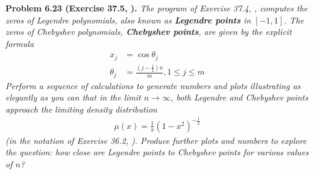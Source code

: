 \documentclass[a4paper,oneside]{book}
\numberwithin{equation}{chapter}
\begin{document}
\textbf{Problem 6.23 (Exercise 37.5, \cite{1}).} \textit{The program of Exercise 37.4, \cite{1}, computes the zeros of Legendre polynomials, also known as \textbf{Legendre points} in $\left[-1,1\right]$. The zeros of Chebyshev polynomials, \textbf{Chebyshev points}, are given by the explicit formula}
\begin{align}
{x_j} &= \cos {\theta _j}\\
{\theta _j} &= \frac{{\left( {j - \frac{1}{2}} \right)\pi }}{m},1 \le j \le m
\end{align}
\textit{Perform a sequence of calculations to generate numbers and plots illustrating as elegantly as you can that in the limit $n\to \infty$, both Legendre and Chebyshev points approach the limiting density distribution}
\begin{align}
\mu \left( x \right) = \frac{1}{\pi }{\left( {1 - {x^2}} \right)^{ - \frac{1}{2}}}
\end{align}
\textit{(in the notation of Exercise 36.2, \cite{1}). Produce further plots and numbers to explore the question: how close are Legendre points to Chebyshev points for various values of $n$?}
\end{document}
